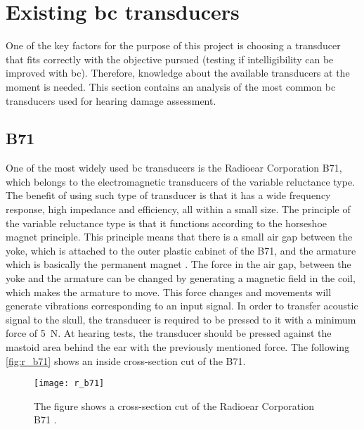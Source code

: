 \section{Existing \gls{bc} transducers}
One of the key factors for the purpose of this project is choosing a transducer that fits correctly with the objective pursued (testing if intelligibility can be improved with \gls{bc}). Therefore, knowledge about the available transducers at the moment is needed. %
This section contains an analysis of the most common \gls{bc} transducers used for hearing damage assessment. %

\subsection{B71}
One of the most widely used \gls{bc} transducers is the Radioear Corporation B71, which belongs to the electromagnetic transducers of the variable reluctance type. The benefit of using such type of transducer is that it has a wide frequency response, high impedance and efficiency, all within a small size. The principle of the variable reluctance type is that it functions according to the horseshoe magnet principle. This principle means that there is a small air gap between the yoke, which is attached to the outer plastic cabinet of the B71, and the armature which is basically the permanent magnet \citep{the_balanced_2003}. The force in the air gap, between the yoke and the armature can be changed by generating a magnetic field in the coil, which makes the armature to move. This force changes and movements will generate vibrations corresponding to an input signal. In order to transfer acoustic signal to the skull, the transducer is required to be pressed to it with a minimum force of \SI{5}{\newton}. At hearing tests, the transducer should be pressed against the mastoid area behind the ear with the previously mentioned force. The following \autoref{fig:r_b71} shows an inside cross-section cut of the B71.

 \begin{figure}[H]
	\centering
		\texttt{[image: r\_b71]}
		\caption{The figure shows a cross-section cut of the Radioear Corporation B71  \citep{the_balanced_2003}.}
		\label{fig:r_b71}
\end{figure}

